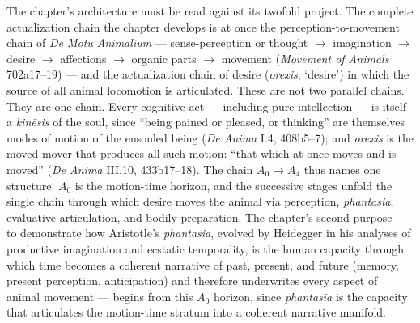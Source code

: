 The chapter's architecture must be read against its twofold project. The complete actualization chain the chapter develops is at once the perception-to-movement chain of \textit{De Motu Animalium} --- sense-perception or thought $\rightarrow$ imagination $\rightarrow$ desire $\rightarrow$ affections $\rightarrow$ organic parts $\rightarrow$ movement (\textit{Movement of Animals} 702a17--19) --- and the actualization chain of desire (\textit{orexis},  `desire') in which the source of all animal locomotion is articulated. These are not two parallel chains. They are one chain. Every cognitive act --- including pure intellection --- is itself a \textit{kinēsis} of the soul, since ``being pained or pleased, or thinking'' are themselves modes of motion of the ensouled being (\textit{De Anima} I.4, 408b5--7); and \textit{orexis} is the moved mover that produces all such motion: ``that which at once moves and is moved'' (\textit{De Anima} III.10, 433b17--18). The chain $A_0 \rightarrow A_4$ thus names one structure: $A_0$ is the motion-time horizon, and the successive stages unfold the single chain through which desire moves the animal via perception, \textit{phantasia}, evaluative articulation, and bodily preparation. The chapter's second purpose --- to demonstrate how Aristotle's \textit{phantasia}, evolved by Heidegger in his analyses of productive imagination and ecstatic temporality, is the human capacity through which time becomes a coherent narrative of past, present, and future (memory, present perception, anticipation) and therefore underwrites every aspect of animal movement --- begins from this $A_0$ horizon, since \textit{phantasia} is the capacity that articulates the motion-time stratum into a coherent narrative manifold.

